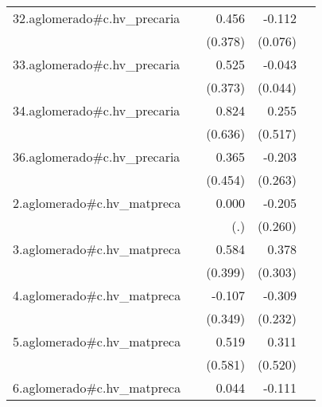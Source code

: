 {\begin{longtable}{l*{4}{D{.}{.}{-1}}}
\addlinespace
32.aglomerado#c.hv\_precaria&                     &       0.456         &      -0.112         &                     \\
            &                     &     (0.378)         &     (0.076)         &                     \\
\addlinespace
33.aglomerado#c.hv\_precaria&                     &       0.525         &      -0.043         &                     \\
            &                     &     (0.373)         &     (0.044)         &                     \\
\addlinespace
34.aglomerado#c.hv\_precaria&                     &       0.824         &       0.255         &                     \\
            &                     &     (0.636)         &     (0.517)         &                     \\
\addlinespace
36.aglomerado#c.hv\_precaria&                     &       0.365         &      -0.203         &                     \\
            &                     &     (0.454)         &     (0.263)         &                     \\
\addlinespace
2.aglomerado#c.hv\_matpreca&                     &       0.000         &      -0.205         &                     \\
            &                     &         (.)         &     (0.260)         &                     \\
\addlinespace
3.aglomerado#c.hv\_matpreca&                     &       0.584         &       0.378         &                     \\
            &                     &     (0.399)         &     (0.303)         &                     \\
\addlinespace
4.aglomerado#c.hv\_matpreca&                     &      -0.107         &      -0.309         &                     \\
            &                     &     (0.349)         &     (0.232)         &                     \\
\addlinespace
5.aglomerado#c.hv\_matpreca&                     &       0.519         &       0.311         &                     \\
            &                     &     (0.581)         &     (0.520)         &                     \\
\addlinespace
6.aglomerado#c.hv\_matpreca&                     &       0.044         &      -0.111         &                     \\

\end{longtable}}
